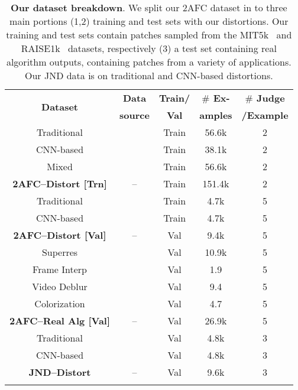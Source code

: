 
\begin{table}[t]
\begin{center}
\scalebox{0.85} {
\begin{tabular}{c c c c c }
\multirow{2}[2]{*}{\textbf{Dataset}} & \textbf{Data} & \textbf{Train/} & \textbf{$\#$ Ex-} & \textbf{$\#$ Judge} \\
& \textbf{source} & \textbf{Val} & \textbf{amples} & \textbf{/Example} \\ \midrule \midrule
Traditional & ~\cite{fivek} & Train & 56.6k & 2 \\
CNN-based & ~\cite{fivek} & Train & 38.1k & 2 \\
Mixed & ~\cite{fivek} & Train & 56.6k & 2 \\ \midrule
\textbf{2AFC--Distort [Trn]} & -- & Train & 151.4k & 2 \\ \midrule \midrule
Traditional & ~\cite{dang2015raise} & Train & 4.7k & 5 \\
CNN-based & ~\cite{dang2015raise} & Train & 4.7k & 5 \\ \midrule 
\textbf{2AFC--Distort [Val]} & -- & Val & 9.4k & 5\\ \midrule \midrule
Superres & ~\cite{Lim_2017_CVPR_Workshops} & Val & 10.9k & 5\\
Frame Interp & ~\cite{scharstein2002taxonomy} & Val & 1.9 & 5\\
Video Deblur & ~\cite{baker2011database} & Val & 9.4 & 5\\
Colorization & ~\cite{russakovsky2015imagenet} & Val & 4.7 & 5\\ \midrule
\textbf{2AFC--Real Alg [Val]} & -- & Val & 26.9k & 5 \\ \midrule \midrule
Traditional & ~\cite{dang2015raise} & Val & 4.8k & 3 \\
CNN-based & ~\cite{dang2015raise} & Val & 4.8k & 3 \\ \midrule
\textbf{JND--Distort} & -- & Val & 9.6k & 3 \\ \midrule \midrule
\vspace{-6mm}

\end{tabular}
}
\label{tab:dataset_split}
\caption{\textbf{Our dataset breakdown}. We split our 2AFC dataset in to three main portions (1,2) training and test sets with our distortions. Our training and test sets contain patches sampled from the MIT5k~\cite{fivek} and RAISE1k~\cite{dang2015raise} datasets, respectively  (3) a test set containing real algorithm outputs, containing patches from a variety of applications. Our JND data is on traditional and CNN-based distortions.}
\vspace{-8mm}
\end{center}
\end{table}
